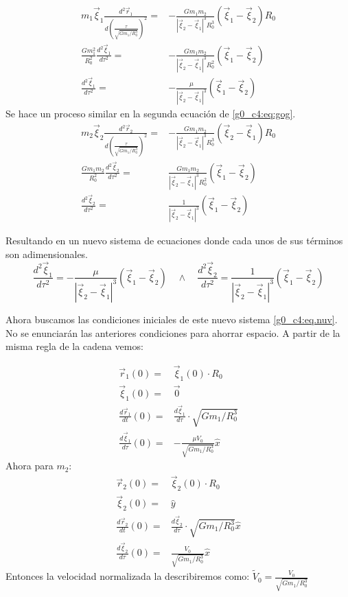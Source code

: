 \documentclass[../portafolio.tex]{subfiles}
\begin{document}
\begin{align}
m_1\vec{\xi}_1\frac{d^2 \vec{r}_1}{d(\frac{\tau}{\sqrt{Gm_1/R_0^3}})^2}=&-\frac{Gm_1m_2}{|\vec{\xi}_2 - \vec{\xi}_1|^3 R_0^3}(\vec{\xi}_1 - \vec{\xi}_2)R_0\\
\frac{Gm_1^2}{R_0^2}\frac{d^2 \vec{\xi}_1}{d\tau^2}=&-\frac{Gm_1m_2}{|\vec{\xi}_2 - \vec{\xi}_1|^3 R_0^2}(\vec{\xi}_1 - \vec{\xi}_2)\\
\frac{d^2 \vec{\xi}_1}{d\tau^2}=&-\frac{\mu}{|\vec{\xi}_2 - \vec{\xi}_1|^3 }(\vec{\xi}_1 - \vec{\xi}_2)
\end{align}
Se hace un proceso similar en la segunda ecuación de \eqref{g0_c4:eq:gog}.
\begin{align}
m_2\vec{\xi}_2\frac{d^2 \vec{r}_2}{d(\frac{\tau}{\sqrt{Gm_1/R_0^3}})^2}=&-\frac{Gm_1m_2}{|\vec{\xi}_2 - \vec{\xi}_1|^3 R_0^3}(\vec{\xi}_2 - \vec{\xi}_1)R_0\\
\frac{Gm_1m_2}{R_0^2}\frac{d^2 \vec{\xi}_2}{d\tau^2}=&\frac{Gm_1m_2}{|\vec{\xi}_2 - \vec{\xi}_1|^3 R_0^2}(\vec{\xi}_1 - \vec{\xi}_2)\\
\frac{d^2 \vec{\xi}_2}{d\tau^2}=&\frac{1}{|\vec{\xi}_2 - \vec{\xi}_1|^3}(\vec{\xi}_1 - \vec{\xi}_2)
\end{align}

Resultando en un nuevo sistema de ecuaciones donde cada unos de sus términos son adimensionales.
\begin{equation}\label{g0_c4:eq.nuv}
\frac{d^2 \vec{\xi}_1}{d\tau^2}=-\frac{\mu}{|\vec{\xi}_2 - \vec{\xi}_1|^3 }(\vec{\xi}_1 - \vec{\xi}_2)\quad \wedge \quad \frac{d^2 \vec{\xi}_2}{d\tau^2}=\frac{1}{|\vec{\xi}_2 - \vec{\xi}_1|^3}(\vec{\xi}_1 - \vec{\xi}_2)
\end{equation}

Ahora buscamos las condiciones iniciales de este nuevo sistema \eqref{g0_c4:eq.nuv}. No se enunciarán las anteriores condiciones para ahorrar espacio.
A partir de la misma regla de la cadena vemos:

\begin{align}
\vec{r}_1(0)=&\vec{\xi}_1(0)\cdot R_0\\
\vec{\xi}_1(0)=&\vec{0}\\
\frac{d\vec{r}_1}{dt}(0)=&\frac{d\vec{\xi}_1}{d\tau}\cdot\sqrt{Gm_1/R_0^3}\\
\frac{d\vec{\xi}_1}{d\tau}(0)=&-\frac{\mu V_0} {\sqrt{Gm_1/R_0^3}}\hat{x}
\end{align}
Ahora para $m_2$:
\begin{align}
\vec{r}_2(0)=&\vec{\xi}_2(0)\cdot R_0\\
\vec{\xi}_2(0)=&\hat{y}\\
\frac{d\vec{r}_2}{dt}(0)=&\frac{d\vec{\xi}_2}{d\tau}\cdot\sqrt{Gm_1/R_0^3}\hat{x}\\
\frac{d\vec{\xi}_2}{d\tau}(0)=&\frac{V_0} {\sqrt{Gm_1/R_0^3}}\hat{x}
\end{align}
Entonces la velocidad normalizada la describiremos como: $\tilde{V}_0=\frac{V_0} {\sqrt{Gm_1/R_0^3}}$
\end{document}
